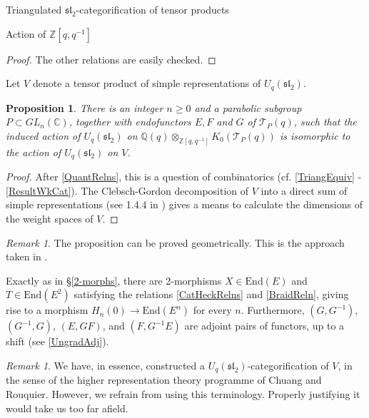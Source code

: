 \documentclass[12pt]{amsart}
\newtheorem{prpn}[thm]{Proposition}
\theoremstyle{definition}
\theoremstyle{remark}
\newtheorem{rmk}[thm]{Remark}
\theoremstyle{remark}
\begin{document}
\begin{section}{Triangulated $\mathfrak{sl}_{2}$-categorification of tensor products}
\begin{subsection}{Action of $\mathbb{Z}[q,q^{-1}]$}
\begin{proof}
The other relations are easily checked.
 \end{proof}

Let $V$ denote a tensor product of simple representations of $U_{q}(\mathfrak{sl}_{2})$. 

\begin{prpn} \label{QuantWkCat} There is an integer $n \geq 0$ and a parabolic subgroup $P \subset GL_{n}(\mathbb{C})$, together with endofunctors $E,F$ and $G$ of $\mathcal{T}_{P}(q)$, such that the induced action of $U_{q}(\mathfrak{sl}_{2})$ on $\mathbb{Q}(q) \otimes_{\mathbb{Z}[q,q^{-1}]} K_{0}(\mathcal{T}_{P}(q))$ is isomorphic to the action of $U_{q}(\mathfrak{sl}_{2})$ on $V$. \end{prpn} 

\begin{proof} After \ref{QuantRelns}, this is a question of combinatorics (cf. \ref{TriangEquiv} - \ref{ResultWkCat}). The Clebsch-Gordon decomposition of $V$ into a direct sum of simple representations (see 1.4.4 in \cite{KashiwaraBasesCristallinesDesGroupesQuantiques}) gives a means to calculate the dimensions of the weight spaces of $V$. \end{proof}

\begin{rmk} The proposition can be proved geometrically. This is the approach taken in \cite{ZhengGeometricCategorificationTensorProducts}. \end{rmk}

Exactly as in \S\ref{2-morphs}, there are 2-morphisms $X \in \text{End}(E)$ and $T \in \text{End}(E^{2})$ satisfying the relations \ref{CatHeckRelns} and \ref{BraidReln}, giving rise to a morphism $H_{n}(0) \rightarrow \text{End}(E^{n})$ for every $n$. Furthermore, $(G,G^{-1})$, $(G^{-1},G)$, $(E,GF)$, and $(F,G^{-1}E)$ are adjoint pairs of functors, up to a shift (see \ref{UngradAdj}). 

\begin{rmk} We have, in essence, constructed a $U_{q}(\mathfrak{sl}_{2})$-categorification of $V$, in the sense of the higher representation theory programme of Chuang and Rouquier. However, we refrain from using this terminology. Properly justifying it would take us too far afield. \end{rmk}


\end{subsection}
\end{section}
\end{document}

